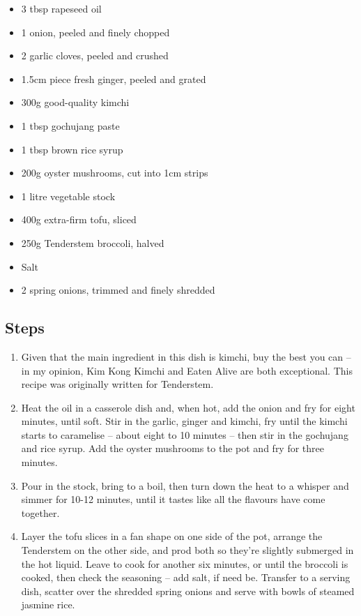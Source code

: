 \documentclass{book}
\begin{document}
\begin{itemize}
\item 3 tbsp rapeseed oil 
\item 1 onion, peeled and finely chopped 
\item 2 garlic cloves, peeled and crushed 
\item 1.5cm piece fresh ginger, peeled and grated 
\item 300g good-quality kimchi 
\item 1 tbsp gochujang paste
\item 1 tbsp brown rice syrup 
\item 200g oyster mushrooms, cut into 1cm strips
\item 1 litre vegetable stock 
\item 400g extra-firm tofu, sliced 
\item 250g Tenderstem broccoli, halved
\item Salt 
\item 2 spring onions, trimmed and finely shredded
\end{itemize}

\subsection*{Steps}
\begin{enumerate}
\item Given that the main ingredient in this dish is kimchi, buy the best you can – in my opinion, Kim Kong Kimchi and Eaten Alive are both exceptional. This recipe was originally written for Tenderstem.
\item Heat the oil in a casserole dish and, when hot, add the onion and fry for eight minutes, until soft. Stir in the garlic, ginger and kimchi, fry until the kimchi starts to caramelise – about eight to 10 minutes – then stir in the gochujang and rice syrup. Add the oyster mushrooms to the pot and fry for three minutes.
\item Pour in the stock, bring to a boil, then turn down the heat to a whisper and simmer for 10-12 minutes, until it tastes like all the flavours have come together.
\item Layer the tofu slices in a fan shape on one side of the pot, arrange the Tenderstem on the other side, and prod both so they’re slightly submerged in the hot liquid. Leave to cook for another six minutes, or until the broccoli is cooked, then check the seasoning – add salt, if need be. Transfer to a serving dish, scatter over the shredded spring onions and serve with bowls of steamed jasmine rice.
\end{enumerate}
\newpage
\end{document}

